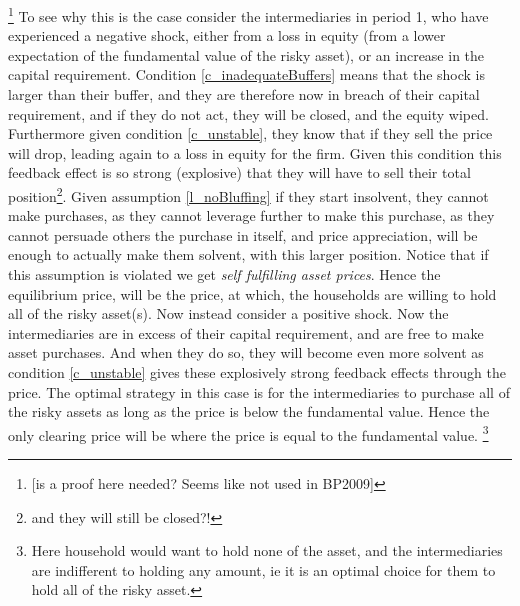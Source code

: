 \documentclass[11pt]{article}
\begin{document}
\footnote{[is a proof here needed? Seems like not used in BP2009]} To see why this is the case consider the intermediaries in period 1, who have experienced a negative shock, either from a loss in equity (from a lower expectation of the fundamental value of the risky asset), or an increase in the capital requirement. Condition \ref{c_inadequateBuffers} means that the shock is larger than their buffer, and they are therefore now in breach of their capital requirement, and if they do not act, they will be closed, and the equity wiped. Furthermore given condition \ref{c_unstable}, they know that if they sell the price will drop, leading again to a loss in equity for the firm. Given this condition this feedback effect is so strong (explosive) that they will have to sell their total position\footnote{and they will still be closed?!}. Given assumption \ref{l_noBluffing} if they start insolvent, they cannot make purchases, as they cannot leverage further to make this purchase, as they cannot persuade others the purchase in itself, and price appreciation, will be enough to actually make them solvent, with this larger position. Notice that if this assumption is violated we get \textit{self fulfilling asset prices}. Hence the equilibrium price, will be the price, at which, the households are willing to hold all of the risky asset(s). Now instead consider a positive shock. Now the intermediaries are in excess of their capital requirement, and are free to make asset purchases. And when they do so, they will become even more solvent as condition \ref{c_unstable} gives these explosively strong feedback effects through the price. The optimal strategy in this case is for the intermediaries to purchase all of the risky assets as long as the price is below the fundamental value. Hence the only clearing price will be where the price is equal to the fundamental value. \footnote{Here household would want to hold none of the asset, and the intermediaries are indifferent to holding any amount, ie it is an optimal choice for them to hold all of the risky asset.}
\end{document}
